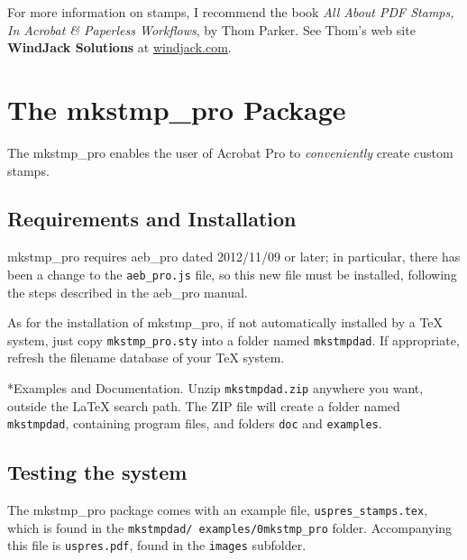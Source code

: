 \documentclass{article}
\makeatletter
\def\pkg{\textsf}
\let\app\textsf
\renewcommand{\subparagraph}
    {\@startsection{subparagraph}{5}{\parindent}{6pt}{-3pt}%
    {\normalfont\normalsize\bfseries}}
\makeatother
\begin{document}
For more information on stamps, I recommend the book \emph{All About PDF Stamps,
In Acrobat \& Paperless Workflows}, by Thom Parker. See Thom's web site
\textbf{WindJack Solutions} at \url{windjack.com}.

\section{The \texorpdfstring{\pkg{mkstmp\_pro}}{mkstmp\_pro} Package}

The \pkg{mkstmp\_pro} enables the user of \app{Acrobat Pro} to
\textit{conveniently} create custom stamps.

\subsection{Requirements and Installation}

\pkg{mkstmp\_pro} requires \pkg{aeb\_pro} dated 2012/11/09 or later; in
particular, there has been a change to the \texttt{aeb\_pro.js} file, so
this new file must be installed, following the steps described in the
\pkg{aeb\_pro} manual.

As for the installation of \pkg{mkstmp\_pro}, if not automatically installed
by a {\TeX} system, just copy \texttt{mkstmp\_pro.sty} into a folder named
\texttt{mkstmpdad}. If appropriate, refresh the filename database of your
{\TeX} system.

\subparagraph*{Examples and Documentation.} Unzip \texttt{mkstmpdad.zip}
anywhere you want, outside the {\LaTeX} search path. The \textsf{ZIP} file will
create a folder named \texttt{mkstmpdad}, containing program files, and
folders \texttt{doc} and \texttt{examples}.

\subsection{Testing the system}

The \pkg{mkstmp\_pro} package comes with an example file,
\texttt{uspres\_stamps.tex}, which is found in the \texttt{mkstmpdad/
examples/\penalty0mkstmp\_pro} folder. Accompanying this file is
\texttt{uspres.pdf}, found in the \texttt{images} subfolder.
\end{document}
